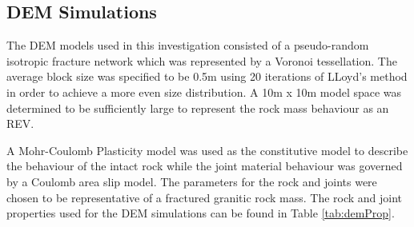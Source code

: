 \subsection{DEM Simulations}

The DEM models used in this investigation consisted of a pseudo-random isotropic fracture network which was represented by a Voronoi tessellation. The average block size was specified to be 0.5m using 20 iterations of LLoyd's method \cite{Lloyd_1982} in order to achieve a more even size distribution. A 10m x 10m model space was determined to be sufficiently large to represent the rock mass behaviour as an REV. 

A Mohr-Coulomb Plasticity model was used as the constitutive model to describe the behaviour of the intact rock while the joint material behaviour was governed by a Coulomb area slip model. The parameters for the rock and joints were chosen to be representative of a fractured granitic rock mass. The rock and joint properties used for the DEM simulations can be found in Table \ref{tab:demProp}.





